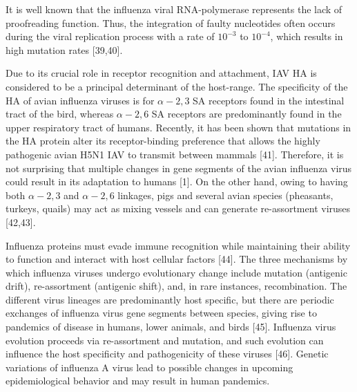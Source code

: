 \documentclass[onecolumn, compsoc,10pt]{IEEEtran}
\begin{document}
{\color{Green1}


  It is well known that the influenza viral RNA-polymerase represents the lack of proofreading function. Thus, the integration of faulty nucleotides often occurs during the viral replication process with a rate of $10^{-3}$ to $10^{-4}$, which results in high mutation rates [39,40].



  
  Due to its crucial role in receptor recognition and attachment, IAV HA is considered to be a principal determinant of the host-range. The specificity of the HA of avian influenza viruses is for $\alpha-2,3$ SA receptors found in the intestinal tract of the bird, whereas $\alpha-2,6$ SA receptors are predominantly found in the upper respiratory tract of humans. Recently, it has been shown that mutations in the HA protein alter its receptor-binding preference that allows the highly pathogenic avian H5N1 IAV to transmit between mammals [41]. Therefore, it is not surprising that multiple changes in gene segments of the avian influenza virus could result in its adaptation to humans [1]. On the other hand, owing to having both $\alpha-2,3$ and $\alpha-2,6$  linkages, pigs and several avian species (pheasants, turkeys, quails) may act as mixing vessels and can generate re-assortment viruses [42,43].


  Influenza proteins must evade immune recognition while maintaining their ability to function and interact with host cellular factors [44]. The three mechanisms by which influenza viruses undergo evolutionary change include mutation (antigenic drift), re-assortment (antigenic shift), and, in rare instances, recombination. The different virus lineages are predominantly host specific, but there are periodic exchanges of influenza virus gene segments between species, giving rise to pandemics of disease in humans, lower animals, and birds [45]. Influenza virus evolution proceeds via re-assortment and mutation, and such evolution can influence the host specificity and pathogenicity of these viruses [46]. Genetic variations of influenza A virus lead to possible changes in upcoming epidemiological behavior and may result in human pandemics.


}
\end{document}
